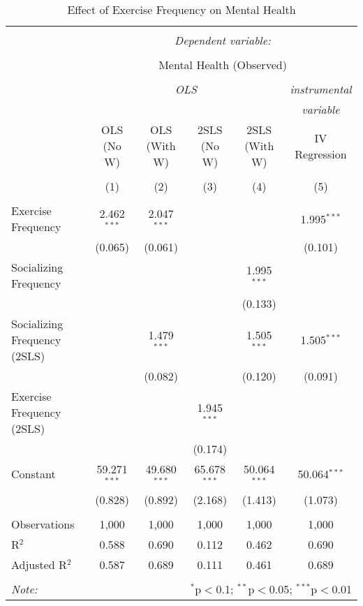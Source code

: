\documentclass[
  letterpaper,
  DIV=11,
  numbers=noendperiod]{scrartcl}
\begin{document}
\begin{sidewaystable}[!htbp] \centering 
  \caption{Effect of Exercise Frequency on Mental Health} 
  \label{} 
\begin{tabular}{@{\extracolsep{5pt}}lccccc} 
\\[-1.8ex]\hline 
\hline \\[-1.8ex] 
 & \multicolumn{5}{c}{\textit{Dependent variable:}} \\ 
\cline{2-6} 
\\[-1.8ex] & \multicolumn{5}{c}{Mental Health (Observed)} \\ 
\\[-1.8ex] & \multicolumn{4}{c}{\textit{OLS}} & \textit{instrumental} \\ 
 & \multicolumn{4}{c}{\textit{}} & \textit{variable} \\ 
 & OLS (No W) & OLS (With W) & 2SLS (No W) & 2SLS (With W) & IV Regression \\ 
\\[-1.8ex] & (1) & (2) & (3) & (4) & (5)\\ 
\hline \\[-1.8ex] 
 Exercise Frequency & 2.462$^{***}$ & 2.047$^{***}$ &  &  & 1.995$^{***}$ \\ 
  & (0.065) & (0.061) &  &  & (0.101) \\ 
  Socializing Frequency &  &  &  & 1.995$^{***}$ &  \\ 
  &  &  &  & (0.133) &  \\ 
  Socializing Frequency (2SLS) &  & 1.479$^{***}$ &  & 1.505$^{***}$ & 1.505$^{***}$ \\ 
  &  & (0.082) &  & (0.120) & (0.091) \\ 
  Exercise Frequency (2SLS) &  &  & 1.945$^{***}$ &  &  \\ 
  &  &  & (0.174) &  &  \\ 
  Constant & 59.271$^{***}$ & 49.680$^{***}$ & 65.678$^{***}$ & 50.064$^{***}$ & 50.064$^{***}$ \\ 
  & (0.828) & (0.892) & (2.168) & (1.413) & (1.073) \\ 
 \hline \\[-1.8ex] 
Observations & 1,000 & 1,000 & 1,000 & 1,000 & 1,000 \\ 
R$^{2}$ & 0.588 & 0.690 & 0.112 & 0.462 & 0.690 \\ 
Adjusted R$^{2}$ & 0.587 & 0.689 & 0.111 & 0.461 & 0.689 \\ 
\hline 
\hline \\[-1.8ex] 
\textit{Note:}  & \multicolumn{5}{r}{$^{*}$p$<$0.1; $^{**}$p$<$0.05; $^{***}$p$<$0.01} \\ 
\end{tabular} 
\end{sidewaystable}
\end{document}
